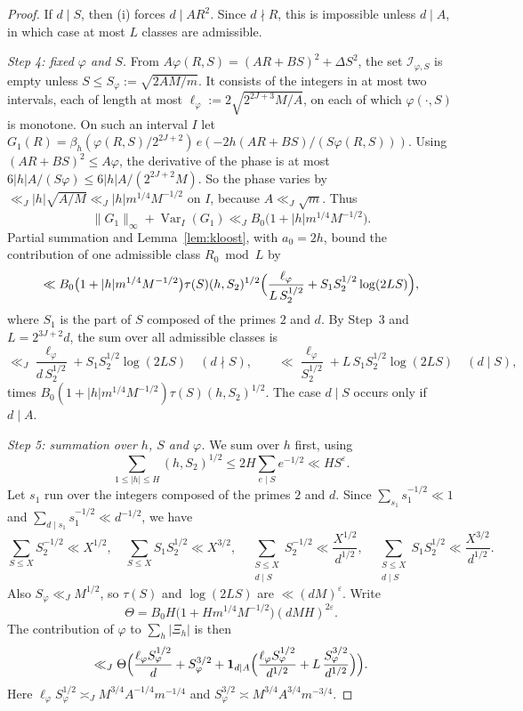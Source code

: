 \documentclass[11pt]{amsart}
\theoremstyle{remark}
\theoremstyle{definition}
\numberwithin{equation}{section}
\newcommand{\eps}{\varepsilon}
\newcommand{\Var}{\operatorname{Var}}
\begin{document}
\begin{proof}
If $d\mid S$, then (i) forces $d\mid AR^2$. Since $d\nmid R$, this is impossible unless $d\mid A$, in which case at most $L$ classes are admissible.

\emph{Step 4: fixed $\varphi$ and $S$.} From $A\varphi(R,S)=(AR+BS)^2+\Delta S^2$, the set $\mathcal I_{\varphi,S}$ is empty unless $S\le S_\varphi:=\sqrt{2AM/m}$. It consists of the integers in at most two intervals, each of length at most $\ell_\varphi:=2\sqrt{2^{2J+3}M/A}$, on each of which $\varphi(\cdot,S)$ is monotone. On such an interval $I$ let $G_1(R)=\beta_h(\varphi(R,S)/2^{2J+2})\,e(-2h(AR+BS)/(S\varphi(R,S)))$. Using $(AR+BS)^2\le A\varphi$, the derivative of the phase is at most $6|h|A/(S\varphi)\le6|h|A/(2^{2J+2}M)$. So the phase varies by $\ll_J|h|\sqrt{A/M}\ll_J|h|m^{1/4}M^{-1/2}$ on $I$, because $A\ll_J\sqrt m$. Thus
\[
\|G_1\|_\infty+\Var_I(G_1)\ll_J B_0\bigl(1+|h|m^{1/4}M^{-1/2}\bigr).
\]
Partial summation and Lemma~\ref{lem:kloost}, with $a_0=2h$, bound the contribution of one admissible class $R_0\bmod L$ by
\[
\ll B_0\bigl(1+|h|m^{1/4}M^{-1/2}\bigr)\tau(S)(h,S_2)^{1/2}\Bigl(\frac{\ell_\varphi}{L\,S_2^{1/2}}+S_1S_2^{1/2}\log(2LS)\Bigr),
\]
where $S_1$ is the part of $S$ composed of the primes $2$ and $d$. By Step~3 and $L=2^{3J+2}d$, the sum over all admissible classes is
\[
\ll_J\frac{\ell_\varphi}{d\,S_2^{1/2}}+S_1S_2^{1/2}\log(2LS)\quad(d\nmid S),\qquad\ll\frac{\ell_\varphi}{S_2^{1/2}}+L\,S_1S_2^{1/2}\log(2LS)\quad(d\mid S),
\]
times $B_0(1+|h|m^{1/4}M^{-1/2})\tau(S)(h,S_2)^{1/2}$. The case $d\mid S$ occurs only if $d\mid A$.

\emph{Step 5: summation over $h$, $S$ and $\varphi$.} We sum over $h$ first, using
\[
\sum_{1\le|h|\le H}(h,S_2)^{1/2}\le2H\sum_{e\mid S}e^{-1/2}\ll HS^{\eps}.
\]
Let $s_1$ run over the integers composed of the primes $2$ and $d$. Since $\sum_{s_1}s_1^{-1/2}\ll1$ and $\sum_{d\mid s_1}s_1^{-1/2}\ll d^{-1/2}$, we have
\[
\sum_{S\le X}S_2^{-1/2}\ll X^{1/2},\quad\sum_{S\le X}S_1S_2^{1/2}\ll X^{3/2},\quad\sum_{\substack{S\le X\\ d\mid S}}S_2^{-1/2}\ll\frac{X^{1/2}}{d^{1/2}},\quad\sum_{\substack{S\le X\\ d\mid S}}S_1S_2^{1/2}\ll\frac{X^{3/2}}{d^{1/2}}.
\]
Also $S_\varphi\ll_J M^{1/2}$, so $\tau(S)$ and $\log(2LS)$ are $\ll(dM)^{\eps}$. Write
\[
\Theta=B_0H\bigl(1+Hm^{1/4}M^{-1/2}\bigr)(dMH)^{2\eps}.
\]
The contribution of $\varphi$ to $\sum_h|\Xi_h|$ is then
\[
\ll_J\Theta\Bigl(\frac{\ell_\varphi S_\varphi^{1/2}}{d}+S_\varphi^{3/2}+\mathbf 1_{d\mid A}\Bigl(\frac{\ell_\varphi S_\varphi^{1/2}}{d^{1/2}}+L\,\frac{S_\varphi^{3/2}}{d^{1/2}}\Bigr)\Bigr).
\]
Here $\ell_\varphi S_\varphi^{1/2}\asymp_JM^{3/4}A^{-1/4}m^{-1/4}$ and $S_\varphi^{3/2}\asymp M^{3/4}A^{3/4}m^{-3/4}$.


\end{proof}
\end{document}
